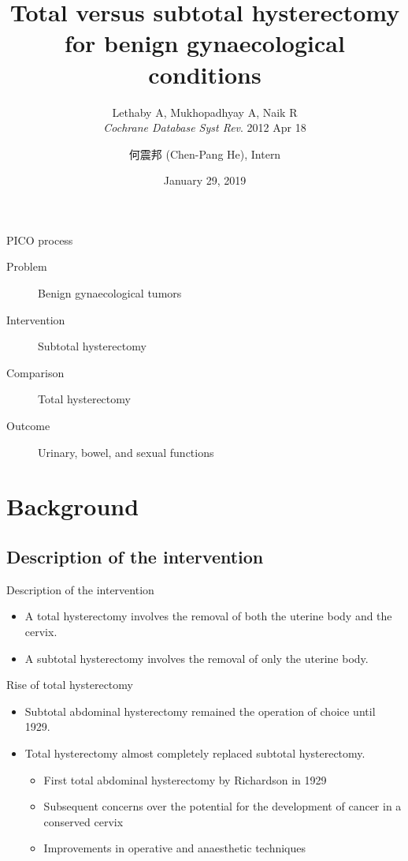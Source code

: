 \documentclass{beamer}
\title[Hysterectomy]{Total versus subtotal hysterectomy for benign gynaecological conditions}
\subtitle{
    Lethaby A, Mukhopadhyay A, Naik R \\
    \textit{Cochrane Database Syst Rev}.  2012 Apr 18
}
\author[Chen-Pang He]{何震邦 (Chen-Pang He), Intern}
\institute[CGH]{Cathay General Hospital}
\date{January 29, 2019}
\begin{document}
\maketitle

\begin{frame}{PICO process}
    \begin{description}
        \item[Problem]      Benign gynaecological tumors
        \item[Intervention] Subtotal hysterectomy
        \item[Comparison]   Total hysterectomy
        \item[Outcome]      Urinary, bowel, and sexual functions
    \end{description}
\end{frame}

\section{Background}
\subsection{Description of the intervention}
\begin{frame}{Description of the intervention}
    \begin{itemize}
        \item A total hysterectomy involves the removal of both the uterine body and the cervix.
        \item A subtotal hysterectomy involves the removal of only the uterine body.
    \end{itemize}
\end{frame}

\begin{frame}{Rise of total hysterectomy}
    \begin{itemize}
        \item Subtotal abdominal hysterectomy remained the operation of choice until 1929.
        \item Total hysterectomy almost completely replaced subtotal hysterectomy.
            \begin{itemize}
                \item First total abdominal hysterectomy by Richardson in 1929
                \item Subsequent concerns over the potential for the development of cancer in a conserved cervix
                \item Improvements in operative and anaesthetic techniques
            \end{itemize}
    \end{itemize}
\end{frame}
\end{document}
